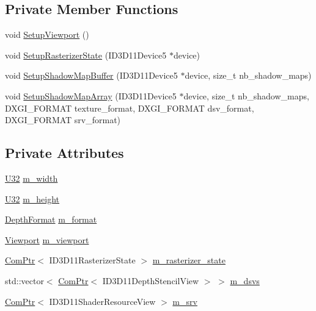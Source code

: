\subsection*{Private Member Functions}
\begin{DoxyCompactItemize}
\item 
void \hyperlink{structmage_1_1_shadow_map_buffer_aacabad92fb9c0bf81cf2f3c1fbae9f13}{Setup\+Viewport} ()
\item 
void \hyperlink{structmage_1_1_shadow_map_buffer_a4cc23df062cfc02ab1b0fdbe1f56161e}{Setup\+Rasterizer\+State} (I\+D3\+D11\+Device5 $\ast$device)
\item 
void \hyperlink{structmage_1_1_shadow_map_buffer_af1aa6aeab0c71dfd52b97fa7167cac17}{Setup\+Shadow\+Map\+Buffer} (I\+D3\+D11\+Device5 $\ast$device, size\+\_\+t nb\+\_\+shadow\+\_\+maps)
\item 
void \hyperlink{structmage_1_1_shadow_map_buffer_a1da4563b5dc84531f24df51e9e94e154}{Setup\+Shadow\+Map\+Array} (I\+D3\+D11\+Device5 $\ast$device, size\+\_\+t nb\+\_\+shadow\+\_\+maps, D\+X\+G\+I\+\_\+\+F\+O\+R\+M\+AT texture\+\_\+format, D\+X\+G\+I\+\_\+\+F\+O\+R\+M\+AT dsv\+\_\+format, D\+X\+G\+I\+\_\+\+F\+O\+R\+M\+AT srv\+\_\+format)
\end{DoxyCompactItemize}
\subsection*{Private Attributes}
\begin{DoxyCompactItemize}
\item 
\hyperlink{namespacemage_a41c104c036fba3756a74e19f793eeaa1}{U32} \hyperlink{structmage_1_1_shadow_map_buffer_ac8c9e5e52c31c9d358e4bb0f306439a6}{m\+\_\+width}
\item 
\hyperlink{namespacemage_a41c104c036fba3756a74e19f793eeaa1}{U32} \hyperlink{structmage_1_1_shadow_map_buffer_a4e4048bd48e7cd347729f1a675a73ed3}{m\+\_\+height}
\item 
\hyperlink{namespacemage_aed4c3f883a30484d0a20762c06be81d4}{Depth\+Format} \hyperlink{structmage_1_1_shadow_map_buffer_a84ec323bfc88313547f21051b2b70637}{m\+\_\+format}
\item 
\hyperlink{classmage_1_1_viewport}{Viewport} \hyperlink{structmage_1_1_shadow_map_buffer_a5dd4126af774f674f69280f53dd8393d}{m\+\_\+viewport}
\item 
\hyperlink{namespacemage_ae74f374780900893caa5555d1031fd79}{Com\+Ptr}$<$ I\+D3\+D11\+Rasterizer\+State $>$ \hyperlink{structmage_1_1_shadow_map_buffer_a46cf9e88e20431629f6622e3647fd58b}{m\+\_\+rasterizer\+\_\+state}
\item 
std\+::vector$<$ \hyperlink{namespacemage_ae74f374780900893caa5555d1031fd79}{Com\+Ptr}$<$ I\+D3\+D11\+Depth\+Stencil\+View $>$ $>$ \hyperlink{structmage_1_1_shadow_map_buffer_a36cb430d4da5bd380e66cf68bb0522c1}{m\+\_\+dsvs}
\item 
\hyperlink{namespacemage_ae74f374780900893caa5555d1031fd79}{Com\+Ptr}$<$ I\+D3\+D11\+Shader\+Resource\+View $>$ \hyperlink{structmage_1_1_shadow_map_buffer_af313b37ddc41f91e949d015086f6ba18}{m\+\_\+srv}
\end{DoxyCompactItemize}



